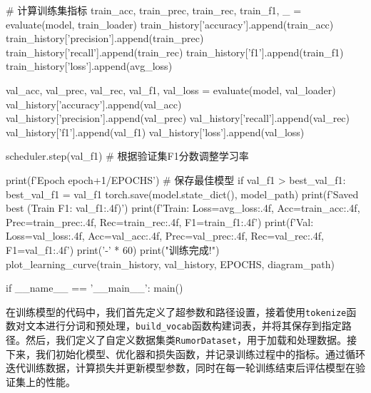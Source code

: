 \begin{codeblock}[language=Python]
        # 计算训练集指标
        train_acc, train_prec, train_rec, train_f1, _ = evaluate(model, train_loader)
        train_history['accuracy'].append(train_acc)
        train_history['precision'].append(train_prec)
        train_history['recall'].append(train_rec)
        train_history['f1'].append(train_f1)
        train_history['loss'].append(avg_loss)

        val_acc, val_prec, val_rec, val_f1, val_loss = evaluate(model, val_loader)
        val_history['accuracy'].append(val_acc)
        val_history['precision'].append(val_prec)
        val_history['recall'].append(val_rec)
        val_history['f1'].append(val_f1)
        val_history['loss'].append(val_loss)
        
        scheduler.step(val_f1)  # 根据验证集F1分数调整学习率
        
        print(f'Epoch {epoch+1}/{EPOCHS}')
        # 保存最佳模型
        if val_f1 > best_val_f1:
            best_val_f1 = val_f1
            torch.save(model.state_dict(), model_path)
            print(f'Saved best (Train F1: {val_f1:.4f})')
        print(f'Train: Loss={avg_loss:.4f}, Acc={train_acc:.4f}, Prec={train_prec:.4f}, Rec={train_rec:.4f}, F1={train_f1:.4f}')
        print(f'Val: Loss={val_loss:.4f}, Acc={val_acc:.4f}, Prec={val_prec:.4f}, Rec={val_rec:.4f}, F1={val_f1:.4f}')
        print('-' * 60)
    print("\n 训练完成!")
    plot_learning_curve(train_history, val_history, EPOCHS, diagram_path)
    
if __name__ == '__main__':
    main()
\end{codeblock}

在训练模型的代码中，我们首先定义了超参数和路径设置，接着使用\verb|tokenize|函数对文本进行分词和预处理，\verb|build_vocab|函数构建词表，并将其保存到指定路径。然后，我们定义了自定义数据集类\verb|RumorDataset|，用于加载和处理数据。接下来，我们初始化模型、优化器和损失函数，并记录训练过程中的指标。通过循环迭代训练数据，计算损失并更新模型参数，同时在每一轮训练结束后评估模型在验证集上的性能。

\vspace{1em}
